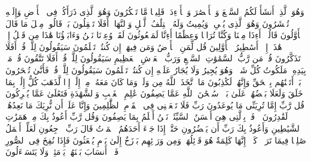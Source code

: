 \startbuffer[\q:23:78]
وَهُوَ ٱلَّذِیۤ أَنشَأَ لَكُمُ ٱلسَّمۡعَ وَٱلۡأَبۡصَٰرَ وَٱلۡأَفۡءِدَةَۚ قَلِیلࣰا مَّا تَشۡكُرُونَ%
\stopbuffer
\startbuffer[\q:23:79]
وَهُوَ ٱلَّذِی ذَرَأَكُمۡ فِی ٱلۡأَرۡضِ وَإِلَیۡهِ تُحۡشَرُونَ%
\stopbuffer
\startbuffer[\q:23:80]
وَهُوَ ٱلَّذِی یُحۡیِۦ وَیُمِیتُ وَلَهُ ٱخۡتِلَٰفُ ٱلَّیۡلِ وَٱلنَّهَارِۚ أَفَلَا تَعۡقِلُونَ%
\stopbuffer
\startbuffer[\q:23:81]
بَلۡ قَالُوا۟ مِثۡلَ مَا قَالَ ٱلۡأَوَّلُونَ%
\stopbuffer
\startbuffer[\q:23:82]
قَالُوۤا۟ أَءِذَا مِتۡنَا وَكُنَّا تُرَابࣰا وَعِظَٰمًا أَءِنَّا لَمَبۡعُوثُونَ%
\stopbuffer
\startbuffer[\q:23:83]
لَقَدۡ وُعِدۡنَا نَحۡنُ وَءَابَاۤؤُنَا هَٰذَا مِن قَبۡلُ إِنۡ هَٰذَاۤ إِلَّاۤ أَسَٰطِیرُ ٱلۡأَوَّلِینَ%
\stopbuffer
\startbuffer[\q:23:84]
قُل لِّمَنِ ٱلۡأَرۡضُ وَمَن فِیهَاۤ إِن كُنتُمۡ تَعۡلَمُونَ%
\stopbuffer
\startbuffer[\q:23:85]
سَیَقُولُونَ لِلَّهِۚ قُلۡ أَفَلَا تَذَكَّرُونَ%
\stopbuffer
\startbuffer[\q:23:86]
قُلۡ مَن رَّبُّ ٱلسَّمَٰوَٰتِ ٱلسَّبۡعِ وَرَبُّ ٱلۡعَرۡشِ ٱلۡعَظِیمِ%
\stopbuffer
\startbuffer[\q:23:87]
سَیَقُولُونَ لِلَّهِۚ قُلۡ أَفَلَا تَتَّقُونَ%
\stopbuffer
\startbuffer[\q:23:88]
قُلۡ مَنۢ بِیَدِهِۦ مَلَكُوتُ كُلِّ شَیۡءࣲ وَهُوَ یُجِیرُ وَلَا یُجَارُ عَلَیۡهِ إِن كُنتُمۡ تَعۡلَمُونَ%
\stopbuffer
\startbuffer[\q:23:89]
سَیَقُولُونَ لِلَّهِۚ قُلۡ فَأَنَّىٰ تُسۡحَرُونَ%
\stopbuffer
\startbuffer[\q:23:90]
بَلۡ أَتَیۡنَٰهُم بِٱلۡحَقِّ وَإِنَّهُمۡ لَكَٰذِبُونَ%
\stopbuffer
\startbuffer[\q:23:91]
مَا ٱتَّخَذَ ٱللَّهُ مِن وَلَدࣲ وَمَا كَانَ مَعَهُۥ مِنۡ إِلَٰهٍۚ إِذࣰا لَّذَهَبَ كُلُّ إِلَٰهِۭ بِمَا خَلَقَ وَلَعَلَا بَعۡضُهُمۡ عَلَىٰ بَعۡضࣲۚ سُبۡحَٰنَ ٱللَّهِ عَمَّا یَصِفُونَ%
\stopbuffer
\startbuffer[\q:23:92]
عَٰلِمِ ٱلۡغَیۡبِ وَٱلشَّهَٰدَةِ فَتَعَٰلَىٰ عَمَّا یُشۡرِكُونَ%
\stopbuffer
\startbuffer[\q:23:93]
قُل رَّبِّ إِمَّا تُرِیَنِّی مَا یُوعَدُونَ%
\stopbuffer
\startbuffer[\q:23:94]
رَبِّ فَلَا تَجۡعَلۡنِی فِی ٱلۡقَوۡمِ ٱلظَّٰلِمِینَ%
\stopbuffer
\startbuffer[\q:23:95]
وَإِنَّا عَلَىٰۤ أَن نُّرِیَكَ مَا نَعِدُهُمۡ لَقَٰدِرُونَ%
\stopbuffer
\startbuffer[\q:23:96]
ٱدۡفَعۡ بِٱلَّتِی هِیَ أَحۡسَنُ ٱلسَّیِّئَةَۚ نَحۡنُ أَعۡلَمُ بِمَا یَصِفُونَ%
\stopbuffer
\startbuffer[\q:23:97]
وَقُل رَّبِّ أَعُوذُ بِكَ مِنۡ هَمَزَٰتِ ٱلشَّیَٰطِینِ%
\stopbuffer
\startbuffer[\q:23:98]
وَأَعُوذُ بِكَ رَبِّ أَن یَحۡضُرُونِ%
\stopbuffer
\startbuffer[\q:23:99]
حَتَّىٰۤ إِذَا جَاۤءَ أَحَدَهُمُ ٱلۡمَوۡتُ قَالَ رَبِّ ٱرۡجِعُونِ%
\stopbuffer
\startbuffer[\q:23:100]
لَعَلِّیۤ أَعۡمَلُ صَٰلِحࣰا فِیمَا تَرَكۡتُۚ كَلَّاۤۚ إِنَّهَا كَلِمَةٌ هُوَ قَاۤئِلُهَاۖ وَمِن وَرَاۤئِهِم بَرۡزَخٌ إِلَىٰ یَوۡمِ یُبۡعَثُونَ%
\stopbuffer
\startbuffer[\q:23:101]
فَإِذَا نُفِخَ فِی ٱلصُّورِ فَلَاۤ أَنسَابَ بَیۡنَهُمۡ یَوۡمَئِذࣲ وَلَا یَتَسَاۤءَلُونَ%
